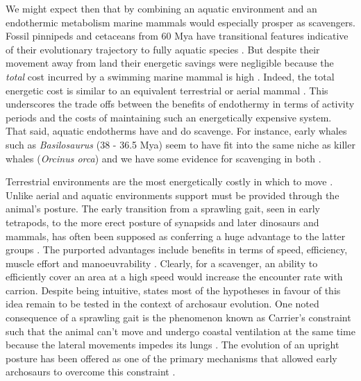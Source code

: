 \documentclass[a4paper,12pt]{article}
\begin{document}
We might expect then that by combining an aquatic environment and an endothermic metabolism marine mammals would especially prosper as scavengers. 
Fossil pinnipeds and cetaceans from 60 Mya have transitional features indicative of their evolutionary trajectory to fully aquatic species \citep{williams1999evolution}.  
But despite their movement away from land their energetic savings were negligible because the \textit{total} cost incurred by a swimming marine mammal is high \citep{williams1999evolution}. 
Indeed, the total energetic cost is similar to an equivalent terrestrial or aerial mammal \citep{williams1999evolution}.
This underscores the trade offs between the benefits of endothermy in terms of activity periods and the costs of maintaining such an energetically expensive system. 
That said, aquatic endotherms have and do scavenge. 
For instance, early whales such as \textit{Basilosaurus} (38 - 36.5 Mya) seem to have fit into the same niche as killer whales (\textit{Orcinus orca}) and we have some evidence for scavenging in both \citep{fahlke2012bite,Whitehead415}.

Terrestrial environments are the most energetically costly in which to move \citep{tucker1975energetic}. 
Unlike aerial and aquatic environments support must be provided through the animal's posture. 
The early transition from a sprawling gait, seen in early tetrapods, to the more erect posture of synapsids and later dinosaurs and mammals, has often been supposed as conferring a huge advantage to the latter groups \citep{sullivan2015posture}.
The purported advantages include benefits in terms of speed, efficiency, muscle effort and manoeuvrability \citep{sullivan2015posture}.
Clearly, for a scavenger, an ability to efficiently cover an area at a high speed would increase the encounter rate with carrion. 
Despite being intuitive, \cite{sullivan2015posture} states most of the hypotheses in favour of this idea remain to be tested in the context of archosaur evolution. 
One noted consequence of a sprawling gait is the phenomenon known as Carrier's constraint such that the animal can't move and undergo coastal ventilation at the same time because the lateral movements impedes its lungs \citep{carrier1987evolution}. 
The evolution of an upright posture has been offered as one of the primary mechanisms that allowed early archosaurs to overcome this constraint \citep{uriona2008recruitment}. 
\end{document}
